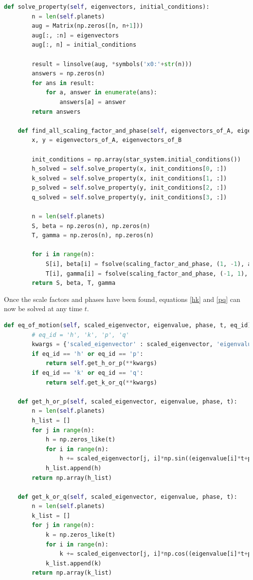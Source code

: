\documentclass[11pt, oneside]{article}   	%
\begin{document}
\begin{lstlisting}[language=Python, caption={Calculating the scale factors and phases}, firstnumber=73]
    def solve_property(self, eigenvectors, initial_conditions):
        n = len(self.planets)
        aug = Matrix(np.zeros([n, n+1]))
        aug[:, :n] = eigenvectors
        aug[:, n] = initial_conditions

        result = linsolve(aug, *symbols('x0:'+str(n)))
        answers = np.zeros(n)
        for ans in result:
            for a, answer in enumerate(ans):
                answers[a] = answer
        return answers

    def find_all_scaling_factor_and_phase(self, eigenvectors_of_A, eigenvectors_of_B):
        x, y = eigenvectors_of_A, eigenvectors_of_B

        init_conditions = np.array(star_system.initial_conditions())
        h_solved = self.solve_property(x, init_conditions[0, :])
        k_solved = self.solve_property(x, init_conditions[1, :])
        p_solved = self.solve_property(y, init_conditions[2, :])
        q_solved = self.solve_property(y, init_conditions[3, :])

        n = len(self.planets)
        S, beta = np.zeros(n), np.zeros(n)
        T, gamma = np.zeros(n), np.zeros(n)

        for i in range(n):
            S[i], beta[i] = fsolve(scaling_factor_and_phase, (1, -1), args=(h_solved[i], k_solved[i],))
            T[i], gamma[i] = fsolve(scaling_factor_and_phase, (-1, 1), args=(p_solved[i], q_solved[i],))
        return S, beta, T, gamma
\end{lstlisting}

Once the scale factors and phases have been found, equations \ref{hk} and \ref{pq} can now be solved at any time $t$.

\begin{lstlisting}[language=Python, caption={Calculating the equations of motion}, firstnumber=103]
    def eq_of_motion(self, scaled_eigenvector, eigenvalue, phase, t, eq_id):
        # eq_id = 'h', 'k', 'p', 'q'
        kwargs = {'scaled_eigenvector' : scaled_eigenvector, 'eigenvalue' : eigenvalue, 'phase' : phase, 't' : t}
        if eq_id == 'h' or eq_id == 'p':
            return self.get_h_or_p(**kwargs)
        if eq_id == 'k' or eq_id == 'q':
            return self.get_k_or_q(**kwargs)
    
    def get_h_or_p(self, scaled_eigenvector, eigenvalue, phase, t):
        n = len(self.planets)
        h_list = []
        for j in range(n):
            h = np.zeros_like(t)
            for i in range(n):
                h += scaled_eigenvector[j, i]*np.sin((eigenvalue[i]*t+phase[i])*np.pi/180)
            h_list.append(h)
        return np.array(h_list)

    def get_k_or_q(self, scaled_eigenvector, eigenvalue, phase, t):
        n = len(self.planets)
        k_list = []
        for j in range(n):
            k = np.zeros_like(t)
            for i in range(n):
                k += scaled_eigenvector[j, i]*np.cos((eigenvalue[i]*t+phase[i])*np.pi/180)
            k_list.append(k)
        return np.array(k_list)
\end{lstlisting}
\end{document}

